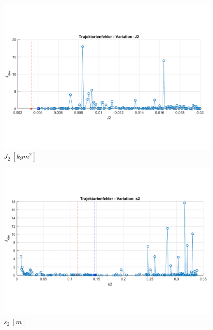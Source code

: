 \begin{figure}[htbp]
	\centering
		\includegraphics[width=1.00\textwidth]{Bilder/Trajektorien/J2.pdf}
	\caption{$J_2 \ [kgm^2]$}
	\label{fig:J2}
\end{figure}

\begin{figure}[htbp]
	\centering
		\includegraphics[width=1.00\textwidth]{Bilder/Trajektorien/s2.pdf}
	\caption{$s_2 \ [m]$}
	\label{fig:s2}
\end{figure}





